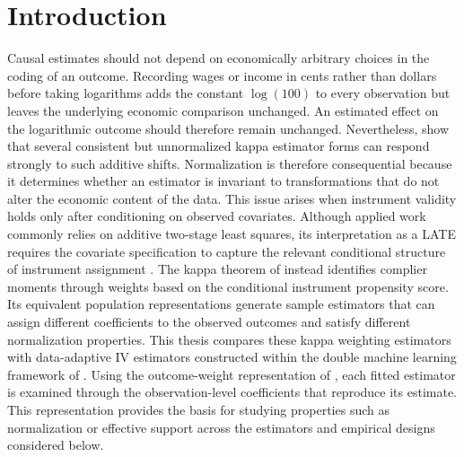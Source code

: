 \documentclass[12pt, a4paper, oneside]{article}
\theoremstyle{plain}
\theoremstyle{definition}
\begin{document}
\newpage
\listoffigures
{}

\newpage
\listoftables
{}



\newpage
{}
\setcounter{page}{1}

\section{Introduction}
Causal estimates should not depend on economically arbitrary choices in the coding of an outcome. Recording wages or income in cents rather than dollars before taking logarithms adds the constant $\log(100)$ to every observation but leaves the underlying economic comparison unchanged. An estimated effect on the logarithmic outcome should therefore remain unchanged. Nevertheless, \citet{sloczynski2025abadie} show that several consistent but unnormalized kappa estimator forms can respond strongly to such additive shifts. Normalization is therefore consequential because it determines whether an estimator is invariant to transformations that do not alter the economic content of the data.
This issue arises when instrument validity holds only after conditioning on observed covariates. Although applied work commonly relies on additive two-stage least squares, its interpretation as a LATE requires the covariate specification to capture the relevant conditional structure of instrument assignment \citep{sloczynski2021when,blandhol2026tsls}. The kappa theorem of \citet{abadie2003semiparametric} instead identifies complier moments through weights based on the conditional instrument propensity score. Its equivalent population representations generate sample estimators that can assign different coefficients to the observed outcomes and satisfy different normalization properties.
This thesis compares these kappa weighting estimators with data-adaptive IV estimators constructed within the double machine learning framework of \citet{chernozhukov2018double}. Using the outcome-weight representation of \citet{knaus2024treatment}, each fitted estimator is examined through the observation-level coefficients that reproduce its estimate. This representation provides the basis for studying properties such as normalization or  effective support across the estimators and empirical designs considered below.
\end{document}
